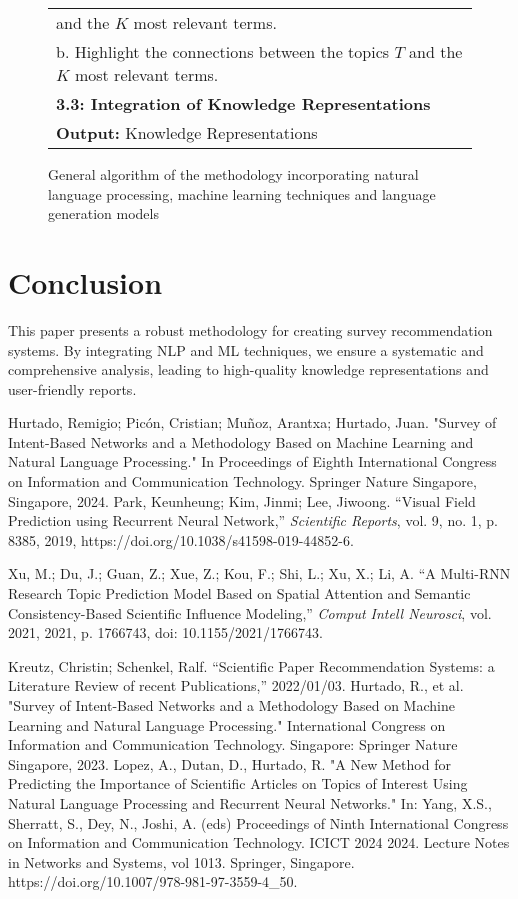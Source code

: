 \documentclass[runningheads]{llncs}
\begin{document}
\begin{figure*}[!h]
\begin{tabular}{l}
		\quad \quad and the $K$ most relevant terms.\\
		\quad \quad b. Highlight the connections between the topics $T$ and the $K$ most relevant terms.\\
		\quad \textbf{3.3: Integration of Knowledge Representations}\\
		\hline
		\textbf{Output:} Knowledge Representations \\
		\hline
	\end{tabular}
	\caption{\centering General algorithm of the methodology incorporating natural language processing, machine learning techniques and language generation models}
	\label{tab:Algorithm}
\end{figure*}


\section{Conclusion}
This paper presents a robust methodology for creating survey recommendation systems. By integrating NLP and ML techniques, we ensure a systematic and comprehensive analysis, leading to high-quality knowledge representations and user-friendly reports.

\begin{thebibliography}{00}
    Hurtado, Remigio; Picón, Cristian; Muñoz, Arantxa; Hurtado, Juan.
    "Survey of Intent-Based Networks and a Methodology Based on Machine Learning and Natural Language Processing."
    In Proceedings of Eighth International Congress on Information and Communication Technology.
    Springer Nature Singapore, Singapore, 2024.
    Park, Keunheung; Kim, Jinmi; Lee, Jiwoong. 
    ``Visual Field Prediction using Recurrent Neural Network,'' 
    \emph{Scientific Reports}, 
    vol. 9, no. 1, p. 8385, 
    2019, 
    https://doi.org/10.1038/s41598-019-44852-6.
    
    Xu, M.; Du, J.; Guan, Z.; Xue, Z.; Kou, F.; Shi, L.; Xu, X.; Li, A. 
    ``A Multi-RNN Research Topic Prediction Model Based on Spatial Attention and Semantic Consistency-Based Scientific Influence Modeling,'' 
    \emph{Comput Intell Neurosci}, 
    vol. 2021, 
    2021, 
    p. 1766743, 
    doi: 10.1155/2021/1766743.
    
    Kreutz, Christin; Schenkel, Ralf.
    ``Scientific Paper Recommendation Systems: a Literature Review of recent Publications,''
    2022/01/03.
	 Hurtado, R., et al. "Survey of Intent-Based Networks and a Methodology Based on Machine Learning and Natural Language Processing." International Congress on Information and Communication Technology. Singapore: Springer Nature Singapore, 2023.
     Lopez, A., Dutan, D., Hurtado, R. "A New Method for Predicting the Importance of Scientific Articles on Topics of Interest Using Natural Language Processing and Recurrent Neural Networks." In: Yang, X.S., Sherratt, S., Dey, N., Joshi, A. (eds) Proceedings of Ninth International Congress on Information and Communication Technology. ICICT 2024 2024. Lecture Notes in Networks and Systems, vol 1013. Springer, Singapore. https://doi.org/10.1007/978-981-97-3559-4\_50.
\end{thebibliography}
\end{document}
